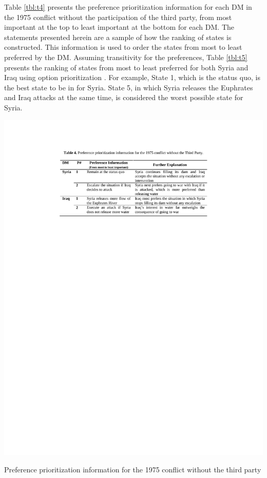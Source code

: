 \documentclass[letterpaper,12pt,titlepage,oneside,final]{book}
\begin{document}
Table \ref{tbl:t4} presents the preference prioritization information for each DM in the 1975 conflict without the participation of the third party, from most important at the top to least important at the bottom for each DM. The statements presented herein are a sample of how the ranking of states is constructed. This information is used to order the states from most to least preferred by the DM. Assuming transitivity for the preferences, Table \ref{tbl:t5} presents the ranking of states from most to least preferred for both Syria and Iraq using option prioritization \citep{hipel1997decision,fang2003a,fang2003b}. For example, State 1, which is the status quo, is the best state to be in for Syria. State 5, in which Syria releases the Euphrates and Iraq attacks at the same time, is considered the worst possible state for Syria.

\begin{table}[H]
\centering
\includegraphics[scale=1]{PDF-IMG/tables/4.pdf}

\caption{Preference prioritization information for the 1975 conflict without the third party}

\label{tbl:t4}
\end{table}
\end{document}
